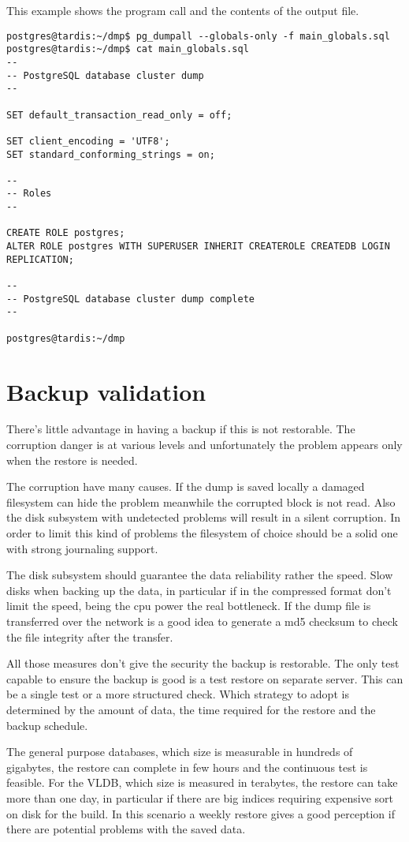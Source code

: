 This example shows the program call and the contents of the output file.
\begin{lstlisting}[style=pgsql]
postgres@tardis:~/dmp$ pg_dumpall --globals-only -f main_globals.sql
postgres@tardis:~/dmp$ cat main_globals.sql 
--
-- PostgreSQL database cluster dump
--

SET default_transaction_read_only = off;

SET client_encoding = 'UTF8';
SET standard_conforming_strings = on;

--
-- Roles
--

CREATE ROLE postgres;
ALTER ROLE postgres WITH SUPERUSER INHERIT CREATEROLE CREATEDB LOGIN REPLICATION;

--
-- PostgreSQL database cluster dump complete
--

postgres@tardis:~/dmp

\end{lstlisting}


\section{Backup validation}
There's little advantage in having a backup if this is not restorable. The corruption danger is at 
various levels and unfortunately the problem appears only when the restore is needed.\newline 

The corruption have many causes. If the dump is saved locally a damaged filesystem can hide the 
problem meanwhile the corrupted block is not read. Also the disk subsystem with undetected problems 
will result in a silent corruption. In order to limit this kind of problems the filesystem of 
choice should be a solid one with strong journaling support.\newline

The disk subsystem should guarantee the data reliability rather the speed. Slow disks when backing 
up the data, in particular if in the compressed format don't limit the speed, being the cpu power 
the real bottleneck.\newline
If the dump file is transferred over the network is a good idea to generate a md5 checksum to 
check the file integrity after the transfer.\newline

All those measures don't give the security the backup is restorable. The only test capable to 
ensure the backup is good is a test restore on separate server. This can be a single test or a more 
structured check. Which strategy to adopt is determined by the amount of data, the time required 
for the restore and the backup schedule.\newline

The general purpose databases, which size is measurable in hundreds of gigabytes, the restore can 
complete in few hours and the continuous test is feasible. For the VLDB, which size is measured in 
terabytes, the restore can take more than one day, in particular if there are big indices requiring 
expensive sort on disk for the build. In this scenario a weekly restore gives a good perception if 
there are potential problems with the saved data. 
